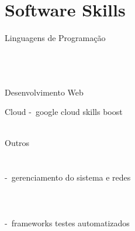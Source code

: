 \documentclass{article}
\begin{document}
\section*{Software Skills}

\begin{skillgroup}{Linguagens de Programação}%
	\\
	\\
	\\
	\\
\end{skillgroup}

\begin{skillgroup}{Desenvolvimento Web}%
	\\
\end{skillgroup}

\begin{skillgroup}{Cloud}%
	 -\ google cloud skills boost\\
	\\
\end{skillgroup}

\begin{skillgroup}{Outros}%
	\\
	\\
	\\
	 -\ gerenciamento do sistema e redes\\
	\\
	\\
	\\
	 -\ frameworks testes automatizados\\
\end{skillgroup}







\end{document}
